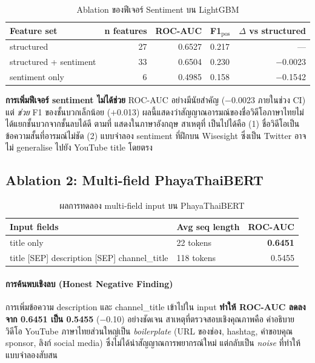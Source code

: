 \begin{table}[H]
\centering
\caption{Ablation ของฟีเจอร์ Sentiment บน LightGBM}
\label{tab:sentiment-ablation}
\begin{tabularx}{\textwidth}{XrrXr}
\toprule
\textbf{Feature set} & \textbf{n features} & \textbf{ROC-AUC} & \textbf{F1$_{\text{pos}}$} & \textbf{$\Delta$ vs structured} \\
\midrule
structured           & 27 & 0.6527 & 0.217 & --- \\
structured + sentiment & 33 & 0.6504 & 0.230 & $-$0.0023 \\
sentiment only       & 6  & 0.4985 & 0.158 & $-$0.1542 \\
\bottomrule
\end{tabularx}
\end{table}

\textbf{การเพิ่มฟีเจอร์ sentiment ไม่ได้ช่วย} ROC-AUC อย่างมีนัยสำคัญ
($-$0.0023 ภายในช่วง CI) แต่ \emph{ช่วย} F1 ของชั้นบวกเล็กน้อย ($+$0.013)
ผลนี้แสดงว่าสัญญาณอารมณ์ของชื่อวิดีโอภาษาไทยไม่ได้แยกชั้นบวกจากชั้นลบได้ดี
ตามที่ \textcite{berger2012makes} แสดงในภาษาอังกฤษ สาเหตุที่
เป็นไปได้คือ (1) ชื่อวิดีโอเป็นข้อความสั้นที่อารมณ์ไม่ชัด (2) แบบจำลอง
sentiment ที่ฝึกบน Wisesight ซึ่งเป็น Twitter อาจไม่ generalise ไปยัง
YouTube title โดยตรง

\subsection{Ablation 2: Multi-field PhayaThaiBERT}

\begin{table}[H]
\centering
\caption{ผลการทดลอง multi-field input บน PhayaThaiBERT}
\label{tab:multifield-ablation}
\begin{tabularx}{\textwidth}{XXr}
\toprule
\textbf{Input fields} & \textbf{Avg seq length} & \textbf{ROC-AUC} \\
\midrule
title only                                   & 22 tokens  & \textbf{0.6451} \\
title [SEP] description [SEP] channel\_title & 118 tokens & 0.5455 \\
\bottomrule
\end{tabularx}
\end{table}

\paragraph{การค้นพบเชิงลบ (Honest Negative Finding)}
การเพิ่มข้อความ description และ channel\_title เข้าไปใน input
\textbf{ทำให้ ROC-AUC ลดลงจาก 0.6451 เป็น 0.5455} ($-$0.10) อย่างชัดเจน
สาเหตุที่ตรวจสอบเชิงคุณภาพคือ คำอธิบายวิดีโอ YouTube ภาษาไทยส่วนใหญ่เป็น
\emph{boilerplate} (URL ของช่อง, hashtag, คำขอบคุณ sponsor, ลิงก์ social
media) ซึ่งไม่ได้นำสัญญาณการพยากรณ์ใหม่ แต่กลับเป็น \emph{noise} ที่ทำให้
แบบจำลองสับสน

